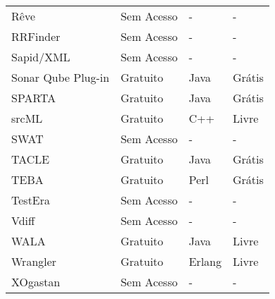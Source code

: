 \begin{longtable}{| l | l | l | l |}
    Rêve &
      Sem Acesso &
      - &
      - \\
    RRFinder &
      Sem Acesso &
      - &
      - \\
    Sapid/XML &
      Sem Acesso &
      - &
      - \\
    Sonar Qube Plug-in &
      Gratuito &
      Java &
      Grátis \\
    SPARTA &
      Gratuito &
      Java &
      Grátis \\
    srcML &
      Gratuito &
      C++ &
      Livre \\
    SWAT &
      Sem Acesso &
      - &
      - \\
    TACLE &
      Gratuito &
      Java &
      Grátis \\
    TEBA &
      Gratuito &
      Perl &
      Grátis \\
    TestEra &
      Sem Acesso &
      - &
      - \\
    Vdiff &
      Sem Acesso &
      - &
      - \\
    WALA &
      Gratuito &
      Java &
      Livre \\
    Wrangler &
      Gratuito &
      Erlang &
      Livre \\
    XOgastan &
      Sem Acesso &
      - &
      - \\
  \hline
\end{longtable}

